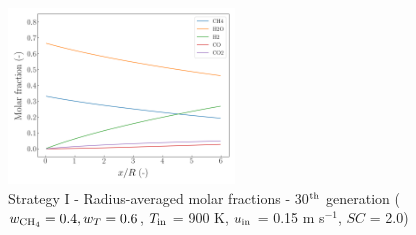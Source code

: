 \documentclass[preprint,12pt]{elsarticle}
\begin{document}
\begin{figure}[h!]
\centering
\includegraphics[width=60mm]{results/5/40C_60T/GEN30-AVG.png}
\caption{\label{fig:5R4060G30-avg} Strategy I - Radius-averaged molar fractions -  30$^{\rm{th}}$ generation ($w_{\rm{CH_4}} = 0.4, w_T = 0.6$, $T_{\rm{in}}$ = 900 K, $u_{\rm{in}}$ = 0.15 m s$^{-1}$, $SC$ = 2.0)}
\end{figure}
\end{document}
